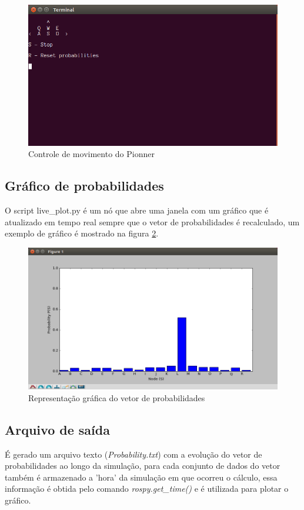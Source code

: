 \documentclass{llncs}
\begin{document}
\begin{figure}
	\centerline{\includegraphics[scale=0.4]{controller}}
	\caption{Controle de movimento do Pionner}
	\label{fig:controller}
\end{figure}


\subsection{Gráfico de probabilidades}
O script live\_plot.py é um nó que abre uma janela com um gráfico que é atualizado em tempo real sempre que o vetor de probabilidades é recalculado, um exemplo de gráfico é mostrado na figura \ref{fig:graph}.

\begin{figure}
	\centerline{\includegraphics[scale=0.4]{graph}}
	\caption{Representação gráfica do vetor de probabilidades}
	\label{fig:graph}
\end{figure}


\subsection{Arquivo de saída}
É gerado um arquivo texto (\textit{Probability.txt}) com a evolução do vetor de probabilidades ao longo da simulação, para cada conjunto de dados do vetor também é armazenado a 'hora' da simulação em que ocorreu o cálculo, essa informação é obtida pelo comando \textit{rospy.get\_time()} e é utilizada para plotar o gráfico.
\end{document}
